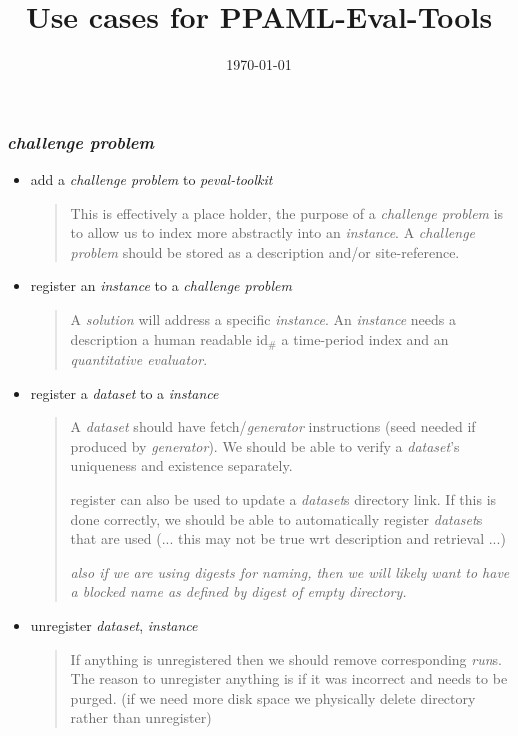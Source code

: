 \documentclass[11pt]{article} %
\title{Use cases for PPAML-Eval-Tools}
\date{\today}
\newenvironment{slimlist}{
  \begin{itemize}
    \setlength{\topsep}{0pt}
    \setlength{\itemsep}{1pt}
    \setlength{\parsep}{0pt}
    \setlength{\parskip}{0pt}
}{\end{itemize}}
\newenvironment{mitemize}[1]{
  \begin{minipage}{0.9\linewidth}
  \subsubsection*{#1}
  \begin{slimlist}
}{\end{slimlist}\end{minipage}}
\begin{document}
\pagestyle{empty}
\clearpage\maketitle
  

\newcommand{\form}[1]{{\em #1}\xspace}
\def\ptk{\form{peval-toolkit}}
\def\cp{\form{challenge problem}}
\def\ev{\form{quantitative evaluator}}
\def\rep{\form{report}}
\def\ds{\form{dataset}}
\def\ins{\form{instance}}
\def\sol{\form{solution}}
\def\gen{\form{generator}}
\def\out{\form{output}}
\def\tm{\form{team}}
\def\rn{\form{run}}
\def\eng{\form{engine}}

\def\G{\form{Galois}}
\def\D{\form{DARPA}}

\begin{mitemize}{\cp}
\item add a \cp to \ptk
  \begin{quote}
    This is effectively a place holder, the purpose of a \cp is to allow us to index more abstractly into an \ins. A \cp should be stored as a description and/or site-reference. 
    \end{quote}
\item register an \ins to a \cp
  \begin{quote}
    A \sol will address a specific \ins. An \ins needs a description a human readable id$_\#$ a time-period index and an \ev. 
    
  \end{quote}
\item register a \ds to a \ins
  \begin{quote}
    A \ds should have fetch/\gen instructions (seed needed if produced by \gen). We should be able to verify a \ds's uniqueness and existence separately.
    
    register can also be used to update a \ds{s} directory link. If this is done correctly, we should be able to automatically register \ds{s} that are used (... this may not be true wrt description and retrieval ...)

    {\em\footnotesize also if we are using digests for naming, then we will likely want to have a blocked name as defined by digest of empty directory.}
  \end{quote}
\item unregister \ds, \ins
  \begin{quote}
    If anything is unregistered then we should remove corresponding \rn{s}. The reason to unregister anything is if it was incorrect and needs to be purged. (if we need more disk space we physically delete directory rather than unregister)
  \end{quote}
  

\end{mitemize}
\end{document}
